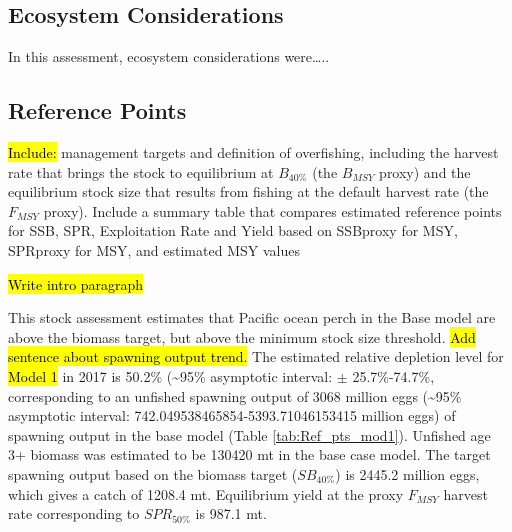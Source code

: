 \documentclass[12pt,]{article}
\begin{document}
\FloatBarrier

\subsection*{Ecosystem Considerations}\label{ecosystem-considerations}

In this assessment, ecosystem considerations were\ldots{}..

\subsection*{Reference Points}\label{reference-points}

\hl{Include:} management targets and definition of overfishing,
including the harvest rate that brings the stock to equilibrium at
\(B_{40\%}\) (the \(B_{MSY}\) proxy) and the equilibrium stock size that
results from fishing at the default harvest rate (the \(F_{MSY}\)
proxy). Include a summary table that compares estimated reference points
for SSB, SPR, Exploitation Rate and Yield based on SSBproxy for MSY,
SPRproxy for MSY, and estimated MSY values

\hl{Write intro paragraph}

This stock assessment estimates that Pacific ocean perch in the Base
model are above the biomass target, but above the minimum stock size
threshold. \hl{Add sentence about spawning output trend.} The estimated
relative depletion level for \hl{Model 1} in 2017 is 50.2\%
(\textasciitilde{}95\% asymptotic interval: \(\pm\) 25.7\%-74.7\%,
corresponding to an unfished spawning output of 3068 million eggs
(\textasciitilde{}95\% asymptotic interval:
742.049538465854-5393.71046153415 million eggs) of spawning output in
the base model (Table \ref{tab:Ref_pts_mod1}). Unfished age 3+ biomass
was estimated to be 130420 mt in the base case model. The target
spawning output based on the biomass target (\(SB_{40\%}\)) is 2445.2
million eggs, which gives a catch of 1208.4 mt. Equilibrium yield at the
proxy \(F_{MSY}\) harvest rate corresponding to \(SPR_{50\%}\) is 987.1
mt.

\FloatBarrier
\end{document}
